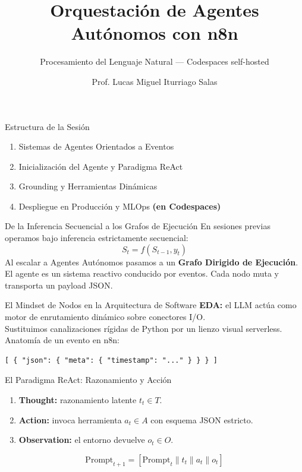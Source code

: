 \documentclass[aspectratio=169,11pt]{beamer}
\title{Orquestación de Agentes Autónomos con n8n}
\subtitle{Procesamiento del Lenguaje Natural --- Codespaces self-hosted}
\author{Prof. Lucas Miguel Iturriago Salas}
\institute[UNAL]{Universidad Nacional de Colombia \\ Dept. Ing. Eléctrica, Electrónica y Computación \\ Primer Semestre -- 2026}
\date{}
\begin{document}
\begin{frame}
  \titlepage
\end{frame}

\begin{frame}{Estructura de la Sesión}
  \begin{enumerate}
    \item Sistemas de Agentes Orientados a Eventos
    \item Inicialización del Agente y Paradigma ReAct
    \item Grounding y Herramientas Dinámicas
    \item Despliegue en Producción y MLOps \textbf{(en Codespaces)}
  \end{enumerate}
\end{frame}

\begin{frame}{De la Inferencia Secuencial a los Grafos de Ejecución}
  En sesiones previas operamos bajo inferencia estrictamente secuencial:
  \begin{equation*}
    S_t = f(S_{t-1}, y_t)
  \end{equation*}
  Al escalar a Agentes Autónomos pasamos a un \textbf{Grafo Dirigido de Ejecución}.
  El agente es un sistema reactivo conducido por eventos. Cada nodo muta y
  transporta un payload JSON.
\end{frame}

\begin{frame}[fragile]{El Mindset de Nodos en la Arquitectura de Software}
  \textbf{EDA:} el LLM actúa como motor de enrutamiento dinámico sobre conectores I/O.\\
  Sustituimos canalizaciones rígidas de Python por un lienzo visual serverless.\\[0.5em]
  Anatomía de un evento en n8n:
\begin{lstlisting}
[ { "json": { "meta": { "timestamp": "..." } } } ]
\end{lstlisting}
\end{frame}

\begin{frame}{El Paradigma ReAct: Razonamiento y Acción}
  \begin{enumerate}
    \item \textbf{Thought:} razonamiento latente $t_t \in T$.
    \item \textbf{Action:} invoca herramienta $a_t \in A$ con esquema JSON estricto.
    \item \textbf{Observation:} el entorno devuelve $o_t \in O$.
  \end{enumerate}
  \begin{equation*}
    \text{Prompt}_{t+1} = [\text{Prompt}_t \parallel t_t \parallel a_t \parallel o_t]
  \end{equation*}
\end{frame}
\end{document}
